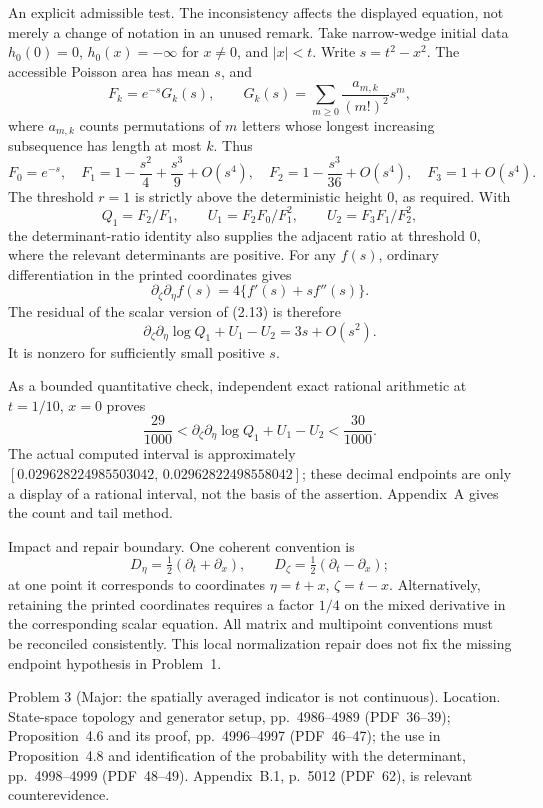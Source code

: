 \documentclass[10pt]{article}
\begin{document}
An explicit admissible test. The inconsistency affects the displayed equation, not merely a change of notation in an unused remark. Take narrow-wedge initial data \(h_0(0)=0\), \(h_0(x)=-\infty\) for \(x\ne0\), and \(|x|<t\). Write \(s=t^2-x^2\). The accessible Poisson area has mean \(s\), and \[F_k=e^{-s}G_k(s),\qquad
G_k(s)=\sum_{m\geq0}\frac{a_{m,k}}{(m!)^2}s^m,\] where \(a_{m,k}\) counts permutations of \(m\) letters whose longest increasing subsequence has length at most \(k\). Thus \[F_0=e^{-s},\quad
F_1=1-\frac{s^2}{4}+\frac{s^3}{9}+O(s^4),\quad
F_2=1-\frac{s^3}{36}+O(s^4),\quad
F_3=1+O(s^4).\] The threshold \(r=1\) is strictly above the deterministic height \(0\), as required. With \[Q_1=F_2/F_1,\qquad
U_1=F_2F_0/F_1^2,\qquad U_2=F_3F_1/F_2^2,\] the determinant-ratio identity also supplies the adjacent ratio at threshold \(0\), where the relevant determinants are positive. For any \(f(s)\), ordinary differentiation in the printed coordinates gives \[\partial_\zeta\partial_\eta f(s)=4\{f'(s)+sf''(s)\}.\] The residual of the scalar version of (2.13) is therefore \[\partial_\zeta\partial_\eta\log Q_1+U_1-U_2
=3s+O(s^2).\] It is nonzero for sufficiently small positive \(s\).\par
As a bounded quantitative check, independent exact rational arithmetic at \(t=1/10\), \(x=0\) proves \[\frac{29}{1000}
<
\partial_\zeta\partial_\eta\log Q_1+U_1-U_2
<
\frac{30}{1000}.\] The actual computed interval is approximately \([0.029628224985503042,\,0.02962822498558042]\); these decimal endpoints are only a display of a rational interval, not the basis of the assertion. Appendix A gives the count and tail method.\par
Impact and repair boundary. One coherent convention is \[D_\eta=\tfrac12(\partial_t+\partial_x),\qquad
D_\zeta=\tfrac12(\partial_t-\partial_x);\] at one point it corresponds to coordinates \(\eta=t+x\), \(\zeta=t-x\). Alternatively, retaining the printed coordinates requires a factor \(1/4\) on the mixed derivative in the corresponding scalar equation. All matrix and multipoint conventions must be reconciled consistently. This local normalization repair does not fix the missing endpoint hypothesis in Problem 1.\par
Problem 3 (Major: the spatially averaged indicator is not continuous).  Location. State-space topology and generator setup, pp. 4986–4989 (PDF 36–39); Proposition 4.6 and its proof, pp. 4996–4997 (PDF 46–47); the use in Proposition 4.8 and identification of the probability with the determinant, pp. 4998–4999 (PDF 48–49). Appendix B.1, p. 5012 (PDF 62), is relevant counterevidence.\par
\end{document}

